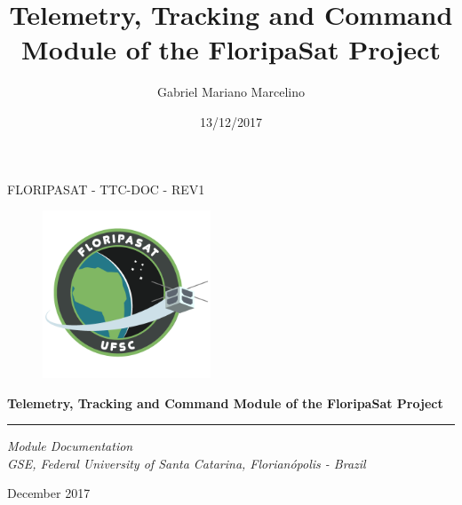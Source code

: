 \documentclass[12pt]{book}
\title{Telemetry, Tracking and Command Module of the FloripaSat Project}
\author{Gabriel Mariano Marcelino}
\date{13/12/2017}
\begin{document}
\begin{titlepage}

\thispagestyle{empty}

\begin{flushleft}
FLORIPASAT - TTC-DOC - REV1
\end{flushleft}

\begin{figure}[!ht]
	\begin{flushleft}
		\includegraphics[width=5cm]{figures/floripasat.png}
	\end{flushleft}
\end{figure}

\begin{flushleft}
\Huge{\textbf{Telemetry, Tracking and Command Module of the FloripaSat Project}}
\rule[0pt]{\textwidth}{5pt}
\end{flushleft}

\vspace{0.2cm}

\begin{flushleft}
\textit{Module Documentation} \\
\textit{GSE, Federal University of Santa Catarina, Florianópolis - Brazil}
\end{flushleft}

\vfill
\vfill

\begin{flushright}
December 2017
\end{flushright}

\setcounter{page}{1}

\end{titlepage}

\cleardoublepage

\end{document}
